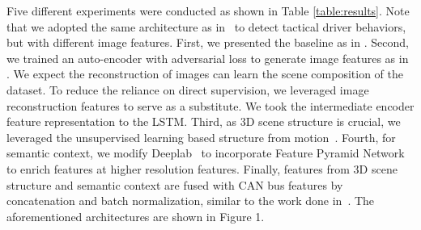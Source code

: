 \documentclass[10pt,twocolumn,letterpaper]{article}
\begin{document}
Five different experiments were conducted as shown in Table \ref{table:results}. Note that we adopted the same architecture as in~\cite{RamanishkaCVPR2018} to detect tactical driver behaviors, but with different image features. First, we presented the baseline as in \cite{RamanishkaCVPR2018}. Second, we trained an auto-encoder with adversarial loss to generate image features as in \cite{santana2016learning}. We expect the reconstruction of images can learn the scene composition of the dataset. To reduce the reliance on direct supervision, we leveraged image reconstruction features to serve as a substitute. We took the intermediate encoder feature representation to the LSTM. Third, as 3D scene structure is crucial, we leveraged the unsupervised learning based structure from motion~\cite{ZhouCVPR2017}. 
Fourth, for semantic context, we modify Deeplab~\cite{ChenPAMI2018} to incorporate Feature Pyramid Network~\cite{LinCVPR2017} to enrich features at higher resolution features. Finally, features from 3D scene structure and semantic context are fused with CAN bus features by concatenation and batch normalization, similar to the work done in~\cite{hazirbas2016fusenet}. The aforementioned architectures are shown in Figure 1.
\end{document}
